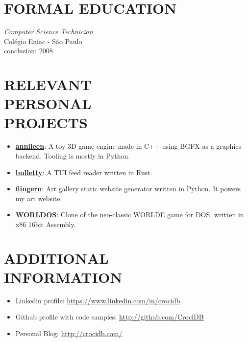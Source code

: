 \documentclass[line,margin]{res}
\begin{document}
\begin{resume}
\section{FORMAL EDUCATION}
        {\sl Computer Science Technician} \\
                Colégio Eniac - São Paulo \\
                conclusion: 2008
                
\section{RELEVANT\\PERSONAL\\PROJECTS}   
        \begin{itemize}  \itemsep 1.25pt
            \item \href{https://github.com/CrociDB/annileen}{\textbf{annileen}}: A toy 3D game engine made in C++ using BGFX as a graphics backend. Tooling is mostly in Python.
            \item \href{https://github.com/CrociDB/bulletty}{\textbf{bulletty}}: A TUI feed reader written in Rust.
            \item \href{https://github.com/CrociDB/flingern}{\textbf{flingern}}: Art gallery static website generator written in Python. It powers my art website.
            \item \href{https://github.com/CrociDB/wordlos}{\textbf{WORLDOS}}: Clone of the neo-classic WORLDE game for DOS, written in x86 16bit Assembly.
        \end{itemize} 


\section{ADDITIONAL \\ INFORMATION}
        \begin{itemize}  \itemsep 1pt
                \item Linkedin profile: \href{https://www.linkedin.com/in/crocidb}{https://www.linkedin.com/in/crocidb}
                \item Github profile with code samples: \href{http://github.com/CrociDB}{http://github.com/CrociDB}
                \item Personal Blog: \href{http://crocidb.com/}{http://crocidb.com/}
        \end{itemize} 

\end{resume}
\end{document}
